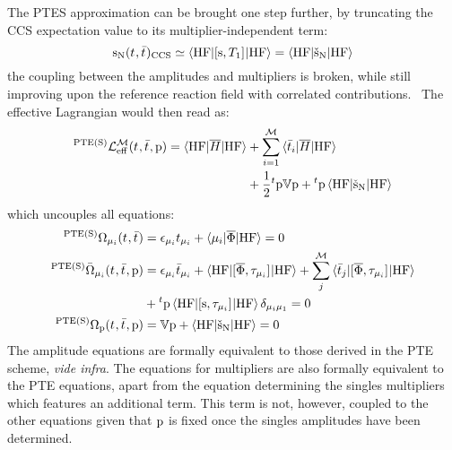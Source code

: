 The \acrshort{PTES} approximation can be brought one step further, by
truncating the \acrshort{CCS} expectation value to its multiplier-independent
term:
\begin{equation}
  \mathrm{s}_{\mathrm{N}}(t_{}, \bar{t}_{})_\mathrm{CCS}
  \simeq
  \braket{\mathrm{HF} | [ \mathrm{s}, T_1 ]^{} | \mathrm{HF}}
  =
  \braket{\mathrm{HF} | \check{\mathrm{s}}_{\mathrm{N}} | \mathrm{HF}}
\end{equation}
the coupling between the amplitudes and multipliers is broken, while
still improving upon the reference reaction field with correlated
contributions.~\autocite{Caricato2011-tx}
The effective Lagrangian would then read as:
\begin{equation}\label{eq:pte-s-cc}
  \begin{aligned}
  {}^{\mathrm{PTE(S)}}\mathcal{L}^\mathcal{M}_\mathrm{eff}(t_{}, \bar{t}_{}, \mathrm{p}) =
  \braket{\mathrm{HF} | \overline{H} | \mathrm{HF}}
  &+ \sum_{i=1}^{\mathcal{M}}\braket{\bar{t}_{i} | \overline{H} | \mathrm{HF}} \\
  &+ \frac{1}{2}{}^t\mathrm{p}\mathbb{V}\mathrm{p} + {}^t\mathrm{p}\braket{\mathrm{HF} | \check{\mathrm{s}}_{\mathrm{N}} | \mathrm{HF}}
  \end{aligned}
\end{equation}
which uncouples all equations:
\begin{subequations}
  \begin{align}
  {}^{\mathrm{PTE(S)}}\Omega_{\mu_i}(t_{}, \bar{t}_{})  &=
   \epsilon_{\mu_i}t_{\mu_i} + \braket{\mu_i | \overline{\Phi} | \mathrm{HF}}
   = 0 \\
   {}^{\mathrm{PTE(S)}}\bar{\Omega}_{\mu_i}(t_{}, \bar{t}_{}, \mathrm{p}) &=
    \epsilon_{\mu_i}\bar{t}_{\mu_i} +
    \braket{\mathrm{HF} | [ \overline{\Phi}, \tau_{\mu_i} ]^{} | \mathrm{HF}} +
    \sum_{j}^{\mathcal{M}}\braket{\bar{t}_{j} |
    [ \overline{\Phi}, \tau_{\mu_i} ]^{} | \mathrm{HF}}
    \nonumber \\
    &+
    {}^t\mathrm{p}\braket{\mathrm{HF} | [ \mathrm{s}, \tau_{\mu_i} ]^{} | \mathrm{HF}}\delta_{\mu_i\mu_1}
    = 0 \\
    {}^{\mathrm{PTE(S)}}\Omega_{\mathrm{p}}(t_{}, \bar{t}_{}, \mathrm{p})
    &=
    \mathbb{V}\mathrm{p} + \braket{\mathrm{HF} | \check{\mathrm{s}}_{\mathrm{N}} | \mathrm{HF}} = 0
  \end{align}
\end{subequations}
The amplitude equations are formally equivalent to those derived in the
\acrshort{PTE} scheme, \emph{vide infra}. The equations for multipliers are also formally
equivalent to the \acrshort{PTE} equations, apart from the equation
determining the singles multipliers which features an additional term.
This term is not, however, coupled to the other equations given that
$\mathrm{p}$ is fixed once the singles amplitudes have been determined.

